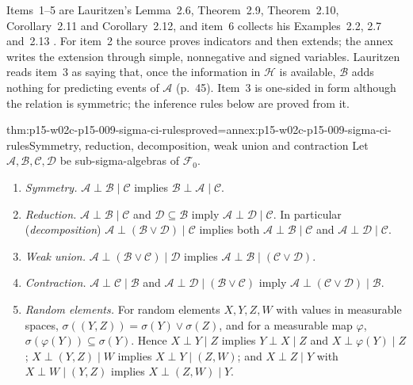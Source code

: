 Items~1--5 are Lauritzen's Lemma~2.6, Theorem~2.9, Theorem~2.10,
Corollary~2.11 and Corollary~2.12, and item~6 collects his
Examples~2.2, 2.7 and~2.13
\cite[pp.~40--46]{Lauritzen2019GraphicalLectures2020}. For item~2 the
source proves indicators and then extends; the annex writes the extension
through simple, nonnegative and signed variables. Lauritzen reads
item~3 as saying that, once the information in \(\mathcal H\) is
available, \(\mathcal B\) adds nothing for predicting events of
\(\mathcal A\) (p.~45). Item~3 is one-sided in form although the relation
is symmetric; the inference rules below are proved from it.

\begin{hbtheorem}{thm:p15-w02c-p15-009-sigma-ci-rules}{proved=annex:p15-w02c-p15-009-sigma-ci-rules}{Symmetry, reduction, decomposition, weak union and contraction}
Let \(\mathcal A,\mathcal B,\mathcal C,\mathcal D\) be sub-sigma-algebras of
\(\mathcal F_0\).
\begin{enumerate}
\item \emph{Symmetry.} \(\mathcal A\perp\mathcal B\mid\mathcal C\) implies
      \(\mathcal B\perp\mathcal A\mid\mathcal C\).
\item \emph{Reduction.} \(\mathcal A\perp\mathcal B\mid\mathcal C\) and
      \(\mathcal D\subseteq\mathcal B\) imply
      \(\mathcal A\perp\mathcal D\mid\mathcal C\). In particular
      (\emph{decomposition}) \(\mathcal A\perp(\mathcal B\vee\mathcal D)\mid\mathcal C\)
      implies both \(\mathcal A\perp\mathcal B\mid\mathcal C\) and
      \(\mathcal A\perp\mathcal D\mid\mathcal C\).
\item \emph{Weak union.} \(\mathcal A\perp(\mathcal B\vee\mathcal C)\mid\mathcal D\)
      implies \(\mathcal A\perp\mathcal B\mid(\mathcal C\vee\mathcal D)\).
\item \emph{Contraction.} \(\mathcal A\perp\mathcal C\mid\mathcal B\) and
      \(\mathcal A\perp\mathcal D\mid(\mathcal B\vee\mathcal C)\) imply
      \(\mathcal A\perp(\mathcal C\vee\mathcal D)\mid\mathcal B\).
\item \emph{Random elements.} For random elements \(X,Y,Z,W\) with values
      in measurable spaces, \(\sigma((Y,Z))=\sigma(Y)\vee\sigma(Z)\), and for
      a measurable map \(\varphi\), \(\sigma(\varphi(Y))\subseteq\sigma(Y)\).
      Hence \(X\perp Y\mid Z\) implies \(Y\perp X\mid Z\) and
      \(X\perp\varphi(Y)\mid Z\); \(X\perp(Y,Z)\mid W\) implies
      \(X\perp Y\mid(Z,W)\); and \(X\perp Z\mid Y\) with
      \(X\perp W\mid(Y,Z)\) implies \(X\perp(Z,W)\mid Y\).
\end{enumerate}
\end{hbtheorem}

